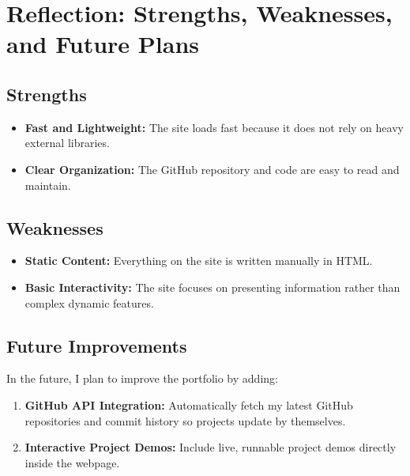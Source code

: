 \documentclass[11pt,a4paper]{article}
\begin{document}
\section{Reflection: Strengths, Weaknesses, and Future Plans}

\subsection{Strengths}
\begin{itemize}
    \item \textbf{Fast and Lightweight:} The site loads fast because it does not rely on heavy external libraries.
    \item \textbf{Clear Organization:} The GitHub repository and code are easy to read and maintain.
\end{itemize}

\subsection{Weaknesses}
\begin{itemize}
    \item \textbf{Static Content:} Everything on the site is written manually in HTML.
    \item \textbf{Basic Interactivity:} The site focuses on presenting information rather than complex dynamic features.
\end{itemize}

\subsection{Future Improvements}
In the future, I plan to improve the portfolio by adding:
\begin{enumerate}
    \item \textbf{GitHub API Integration:} Automatically fetch my latest GitHub repositories and commit history so projects update by themselves.
    \item \textbf{Interactive Project Demos:} Include live, runnable project demos directly inside the webpage.
\end{enumerate}
\end{document}
